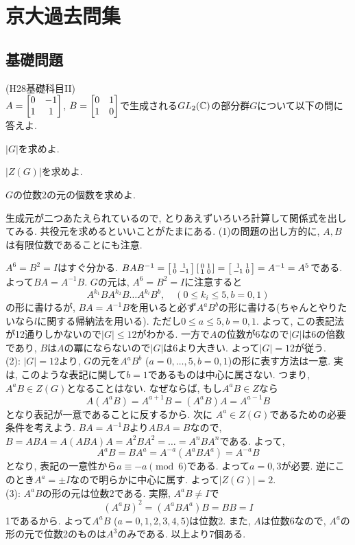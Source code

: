 \section{京大過去問集}
\subsection{基礎問題}
\begin{prob} \checkbox (H28基礎科目II) \\
$A = \begin{bmatrix}0&-1\\ 1&1\end{bmatrix}$, $B = \begin{bmatrix}0&1\\ 1&0\end{bmatrix}$で生成される$GL_2(\mathbb{C})$の部分群$G$について以下の問に答えよ.
\ben
\item $|G|$を求めよ.
\item $|Z(G)|$を求めよ.
\item $G$の位数2の元の個数を求めよ.
\een
\end{prob}
\begin{point}
生成元が二つあたえられているので, とりあえずいろいろ計算して関係式を出してみる. 共役元を求めるといいことがたまにある.  (1)の問題の出し方的に, $A,B$は有限位数であることにも注意.
\end{point}
\begin{ans}
$A^6 = B^2 = I$はすぐ分かる. $BAB^{-1} = \left[\begin{smallmatrix}1&1\\ 0 & -1\end{smallmatrix}\right]\left[\begin{smallmatrix}0&1\\ 1&0\end{smallmatrix}\right] = \left[\begin{smallmatrix}1&1\\ -1&0\end{smallmatrix}\right] = A^{-1} = A^5$である. よって$BA = A^{-1}B$. $G$の元は, $A^6 = B^2 = I$に注意すると
\[A^{k_1} BA^{k_2}B\dots A^{k_l}B^{b},\quad (0\leq k_i\leq 5, b=0,1)\]
の形に書けるが, $BA= A^{-1}B$を用いると必ず$A^{a}B^b$の形に書ける(ちゃんとやりたいなら$l$に関する帰納法を用いる). ただし$0\leq a\leq 5, b=0,1$. よって, この表記法が12通りしかないので$|G| \leq 12$がわかる. 一方で$A$の位数が6なので$|G|$は6の倍数であり, $B$は$A$の冪にならないので$|G|$は6より大きい. よって$|G| = 12$が従う. \\
(2): $|G|=12$より, $G$の元を$A^aB^b$ ($a=0,\dots, 5, b=0,1$)の形に表す方法は一意. 実は, このような表記に関して$b=1$であるものは中心に属さない. つまり, $A^aB\in Z(G)$となることはない.  なぜならば, もし$A^aB\in Z$なら
\[A(A^a B) = A^{a+1}B = (A^a B)A = A^{a-1}B\]
となり表記が一意であることに反するから. 次に $A^a\in Z(G)$であるための必要条件を考えよう. $BA=A^{-1}B$より$ABA = B$なので, $B=ABA = A(ABA)A = A^2BA^2 = \dots = A^nB A^n$である. よって,
\[A^a B = BA^a = A^{-a} (A^a B A^a) = A^{-a} B \]
となり, 表記の一意性から$a\equiv -a\pmod{6}$である. よって$a=0,3$が必要. 逆にこのとき$A^a = \pm I$なので明らかに中心に属す. よって$|Z(G)| = 2$. \\
(3): $A^aB$の形の元は位数2である. 実際, $A^a B \neq I$で
\[(A^aB)^2 = (A^aB A^a)B = B B = I\]
1であるから. よって$A^aB$ ($a=0,1,2,3,4,5$)は位数2. また, $A$は位数6なので, $A^a$の形の元で位数2のものは$A^3$のみである. 以上より$7$個ある.
\end{ans}



